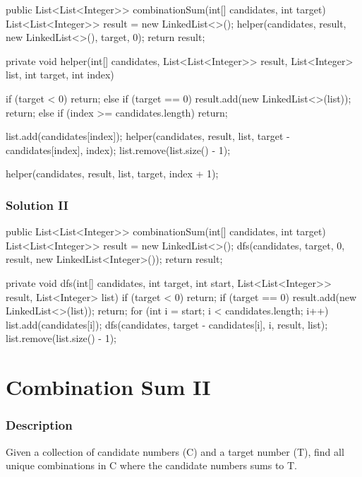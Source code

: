 \begin{Code}
public List<List<Integer>> combinationSum(int[] candidates, int target) {
    List<List<Integer>> result = new LinkedList<>();
    helper(candidates, result, new LinkedList<>(), target, 0);
    return result;
}

private void helper(int[] candidates, List<List<Integer>> result, List<Integer> list, int target, int index) {
    if (target < 0) {
        return;
    } else if (target == 0) {
        result.add(new LinkedList<>(list));
        return;
    } else if (index >= candidates.length) {
        return;
    }

    list.add(candidates[index]);
    helper(candidates, result, list, target - candidates[index], index);
    list.remove(list.size() - 1);

    helper(candidates, result, list, target, index + 1);
}

\end{Code}

\newpage

\subsubsection{Solution II}

\begin{Code}

public List<List<Integer>> combinationSum(int[] candidates, int target) {
    List<List<Integer>> result = new LinkedList<>();
    dfs(candidates, target, 0, result, new LinkedList<Integer>());
    return result;
}

private void dfs(int[] candidates, int target, int start, List<List<Integer>> result, List<Integer> list) {
    if (target < 0) {
        return;
    }
    if (target == 0) {
        result.add(new LinkedList<>(list));
        return;
    }
    for (int i = start; i < candidates.length; i++) {
        list.add(candidates[i]);
        dfs(candidates, target - candidates[i], i, result, list);
        list.remove(list.size() - 1);
    }
}
\end{Code}

\newpage

\section{Combination Sum II} %

\subsubsection{Description}
Given a collection of candidate numbers (C) and a target number (T), find all unique combinations in C where the candidate numbers sums to T.

